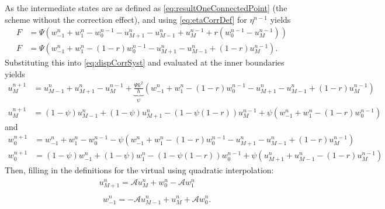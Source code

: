 \documentclass[dvipsnames]{article}
\def\Iterm{\mathcal{A}}
\begin{document}
As the intermediate states are as defined as \eqref{eq:resultOneConnectedPoint} (the scheme without the correction effect), %
and %
using \eqref{eq:etaCorrDef} for $\eta^{n-1}$ yields
\begin{align*}
    F &= \Psi\left(w_{-1}^n + w_1^n - w_0^{n-1} - u_{M+1}^n-u_{M-1}^n + u_M^{n-1} + r (w_0^{n-1} - u_M^{n-1})\right)\\
    F&= \Psi\left(w_{-1}^n + w_1^n - (1-r)w_0^{n-1} - u_{M+1}^n-u_{M-1}^n + (1-r)u_M^{n-1}\right).
\end{align*}
Substituting this into \eqref{eq:dispCorrSyst} and evaluated at the inner boundaries yields
\begin{align*}
    u^{n+1}_M &= u_{M-1}^n + u_{M+1}^n - u_M^{n-1} + \underbrace{\frac{\Psi k^2}{h}}_{\psi}\left(w_{-1}^n + w_1^n - (1-r)w_0^{n-1} - u_{M+1}^n-u_{M-1}^n + (1-r)u_M^{n-1}\right)\\
    u^{n+1}_M &= (1-\psi)u_{M-1}^n + (1-\psi)u_{M+1}^n - (1-\psi(1-r))u_M^{n-1} + \psi\left(w_{-1}^n + w_1^n - (1-r)w_0^{n-1}\right)
\end{align*}
and
\begin{align*}
    w^{n+1}_0 &= w_{-1}^n + w_{1}^n - w_0^{n-1} - \psi\left(w_{-1}^n + w_1^n - (1-r)w_0^{n-1} - u_{M+1}^n-u_{M-1}^n + (1-r)u_M^{n-1}\right)\\
    w^{n+1}_0 &= (1-\psi)w_{-1}^n + (1-\psi)w_{1}^n - (1-\psi(1-r))w_0^{n-1} + \psi\left(u_{M+1}^n+u_{M-1}^n - (1-r)u_M^{n-1}\right)
\end{align*}
Then, filling in the definitions for the virtual using quadratic interpolation:
\def\Iterm{\mathcal{A}}
\begin{subequations}\label{eq:quadraticDef}
    \begin{align}
        &\begin{aligned}\label{eq:calcUMP1}
            u_{M+1}^n = \Iterm u_{M}^n + w_0^n - \Iterm w_1^n
        \end{aligned}\\
        &\ \ \begin{aligned}\label{eq:calcWM1}
            w_{-1}^n
            =-\Iterm u_{M-1}^n + u_{M}^n+ \Iterm w_{0}^n.
        \end{aligned}
    \end{align}
\end{subequations}
\end{document}
